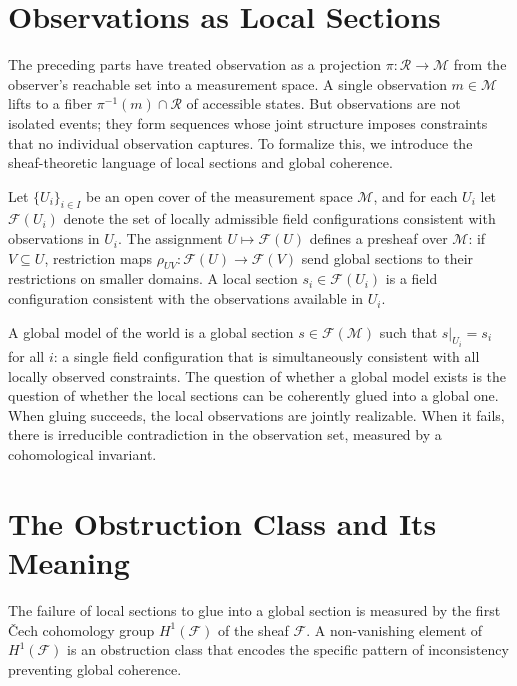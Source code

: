 \documentclass[12pt, a4paper, oneside]{article}
\theoremstyle{plain}
\theoremstyle{definition}
\theoremstyle{remark}
\newcommand{\M}{\mathcal{M}}
\newcommand{\R}{\mathcal{R}}
\newcommand{\proj}{\pi}
\begin{document}
\setcounter{section}{36}

\section{Observations as Local Sections}

The preceding parts have treated observation as a projection $\proj : \R \to \M$ from the observer's reachable set into a measurement space. A single observation $m \in \M$ lifts to a fiber $\proj^{-1}(m) \cap \R$ of accessible states. But observations are not isolated events; they form sequences whose joint structure imposes constraints that no individual observation captures. To formalize this, we introduce the sheaf-theoretic language of local sections and global coherence.

Let $\{U_i\}_{i \in I}$ be an open cover of the measurement space $\M$, and for each $U_i$ let $\mathcal{F}(U_i)$ denote the set of locally admissible field configurations consistent with observations in $U_i$. The assignment $U \mapsto \mathcal{F}(U)$ defines a presheaf over $\M$: if $V \subseteq U$, restriction maps $\rho_{UV} : \mathcal{F}(U) \to \mathcal{F}(V)$ send global sections to their restrictions on smaller domains. A local section $s_i \in \mathcal{F}(U_i)$ is a field configuration consistent with the observations available in $U_i$.

A global model of the world is a global section $s \in \mathcal{F}(\M)$ such that $s|_{U_i} = s_i$ for all $i$: a single field configuration that is simultaneously consistent with all locally observed constraints. The question of whether a global model exists is the question of whether the local sections can be coherently glued into a global one. When gluing succeeds, the local observations are jointly realizable. When it fails, there is irreducible contradiction in the observation set, measured by a cohomological invariant.

\section{The Obstruction Class and Its Meaning}

The failure of local sections to glue into a global section is measured by the first \v{C}ech cohomology group $H^1(\mathcal{F})$ of the sheaf $\mathcal{F}$. A non-vanishing element of $H^1(\mathcal{F})$ is an obstruction class that encodes the specific pattern of inconsistency preventing global coherence.
\end{document}
